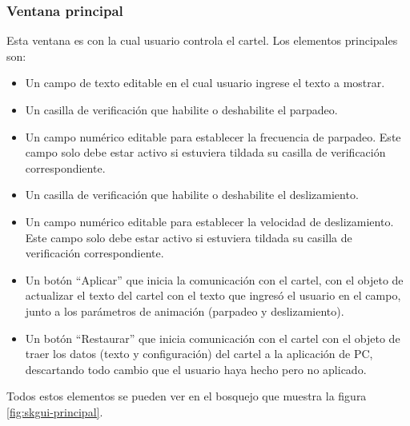 \subsubsection{Ventana principal}

Esta ventana es con la cual usuario controla el cartel. Los elementos principales son:

\begin{itemize}
	\item Un campo de texto editable en el cual usuario ingrese el texto a mostrar.
	\item Un casilla de verificación que habilite o deshabilite el parpadeo.
	\item Un campo numérico editable para establecer la frecuencia de parpadeo. Este campo solo debe estar activo si estuviera tildada su casilla de verificación correspondiente.
	\item Un casilla de verificación que habilite o deshabilite el deslizamiento.
	\item Un campo numérico editable para establecer la velocidad de deslizamiento. Este campo solo debe estar activo si estuviera tildada su casilla de verificación correspondiente.
	\item Un botón \enquote{Aplicar} que inicia la comunicación con el cartel, con el objeto de actualizar el texto del cartel con el texto que ingresó el usuario en el campo, junto a los parámetros de animación (parpadeo y deslizamiento).
	\item Un botón \enquote{Restaurar} que inicia comunicación con el cartel con el objeto de traer los datos (texto y configuración) del cartel a la aplicación de PC, descartando todo cambio que el usuario haya hecho pero no aplicado.
\end{itemize}

Todos estos elementos se pueden ver en el bosquejo que muestra la figura \ref{fig:skgui-principal}.

